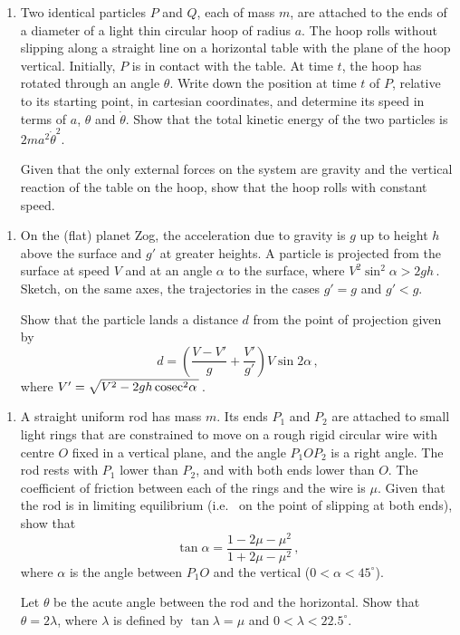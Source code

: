 \documentclass[a4, 11pt]{report}
\newlength{\qspace}
\newcounter{qnumber}
\newenvironment{question}%
 {\vspace{\qspace}
  \begin{enumerate}[\bfseries 1\quad][10]%
    \setcounter{enumi}{\value{qnumber}}%
    \item%
 }
{
  \end{enumerate}
  \filbreak
  \stepcounter{qnumber}
 }
\begin{document}
	
\begin{question}
Two identical particles $P$ and $Q$, each of 
mass $m$, are attached to the ends of a diameter
of a light thin circular hoop of radius $a$. 
The hoop rolls without slipping
 along a straight line
on a horizontal table with  the plane of the hoop vertical.
Initially, $P$ is in contact with 
the table. At time $t$, the hoop has rotated through an angle
$\theta$. Write down the position at time $t$ of $P$, relative to its starting
point, in cartesian coordinates, and  determine its speed in
terms
of $a$, $\theta$ and $\dot\theta$. 
Show that the total 
kinetic energy of the two particles is $2ma^2\dot\theta^2$.

Given that the only external forces on the system are gravity
and the vertical reaction of the table on the hoop,
show that the hoop rolls with constant speed.
	\end{question}
	
\begin{question}	
On the (flat) planet Zog, the acceleration due to gravity 
is $g$ up to height $h$ above the surface and $g'$ at greater heights.
A particle is projected from the surface at speed $V$ and at an 
angle $\alpha$ to the surface, where $V^2 \sin^2\alpha > 2 gh\,$.
Sketch, on the same axes,  the trajectories in the cases $g'=g$
and $g'<g$.

Show that the particle lands a distance $d$ from the point of
projection given by
\[
d = \left(\frac {V-V'} g + \frac {V'}{  g'}  \right)
V\sin2\alpha\,,
\]
where $V' = \sqrt{V^2-2gh\,\rm{cosec}^2\alpha\,}\,$.
\end{question}


\begin{question}
A straight uniform rod has mass $m$. Its  ends $P_1$ and 
$P_2$ are attached to small light rings that are constrained to move
on a rough rigid circular wire with centre $O$
fixed in a vertical plane, and the angle
$P_1OP_2$ is a right angle. 
The rod
rests with $P_1$ lower than $P_2$, and with both ends lower than $O$.
The coefficient
of friction between each of the rings and the wire is $\mu$.  
 Given that the rod is in limiting equilibrium (i.e. \  on the point of
 slipping at both ends),
show that 
\[
\tan \alpha = \frac{1-2\mu -\mu^2}{1+2\mu -\mu^2}\,,
\]
where $\alpha$ is the angle between $P_1O$ and the vertical 
($0<\alpha<45^\circ$).

 Let $\theta$ be 
the acute angle between the rod and the horizontal.
Show that $\theta =2\lambda$, where
$\lambda $ is defined by 
 $\tan \lambda= \mu$ and   $0<\lambda<22.5^\circ$.
\end{question}
	
\end{document}
